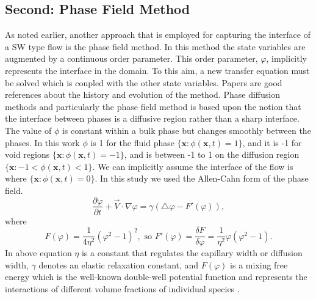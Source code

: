 \documentclass[letterpaper,10pt]{article}
\begin{document}
\subsection{Second: Phase Field Method} \label{phase field}
As noted earlier, another approach that is employed 
for capturing the interface of a SW type flow is the phase field method.
In this method the state variables are augmented by a continuous
order parameter. This order parameter, $\varphi$, 
implicitly represents the interface in the domain. To this aim, a new transfer equation must be solved which is coupled with the other state variables. 
Papers \cite{Chen2002,Anderson1998,Boettinger2002,Kim2012} are good references about the history and evolution of the method.
Phase diffusion methods and particularly the phase field method is based upon the notion that the interface between phases is a diffusive region rather than a sharp interface. 
The value of $\phi$ is constant within a bulk phase but changes smoothly between the phases. In this work $\phi$ is 1 for the fluid phase $ \lbrace \textbf{x}: \phi(\textbf{x},t)=1 \rbrace  $, 
and it is -1 for void regions $ \lbrace \textbf{x}: \phi(\textbf{x},t)=-1 \rbrace  $, and is between -1 to 1 on the diffusion region $ \lbrace \textbf{x}: -1 < \phi(\textbf{x},t) < 1 \rbrace  $. 
We can implicitly assume the interface of the flow is where $ \lbrace \textbf{x}: \phi(\textbf{x},t)= 0 \rbrace  $.
In this study we used the Allen-Cahn form of the phase field. 
\begin{equation} 
        \label{allencahn}
        \frac{\partial \varphi }{\partial t} + \overrightarrow{V}\cdot \nabla \varphi = 
        \gamma (\bigtriangleup\varphi -F'(\varphi)),
\end{equation}
where
\begin{equation} 
        \label{fprime}
        F(\varphi)=\frac{1}{4\eta^2} (\varphi^2-1)^2 ,\text{\ so \ \ } F'(\varphi)= \frac{\delta F}{\delta \varphi} = \frac{1}{\eta^2} \varphi (\varphi^2 -1).
\end{equation}
In above equation $\eta$ is a constant that regulates the capillary width or diffusion width, $ \gamma $ denotes an elastic relaxation constant, and $F(\varphi)$ is 
a mixing free energy which is the well-known double-well potential function and represents the interactions of different volume fractions of individual species \cite{Bronsard1990,Larson1999}.
\end{document}
